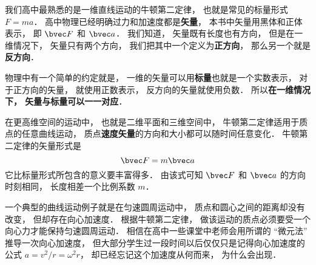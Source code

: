 
\begin{issues}
\issueDraft
\end{issues}


我们高中最熟悉的是一维直线运动的牛顿第二定律， 也就是常见的标量形式 $F = ma$． 高中物理已经明确过力和加速度都是\textbf{矢量}， 本书中矢量用黑体和正体表示， 即 $\bvec F$ 和 $\bvec a$． 我们知道， 矢量既有长度也有方向， 但是在一维情况下， 矢量只有两个方向， 我们把其中一个定义为\textbf{正方向}， 那么另一个就是\textbf{反方向}． 

物理中有一个简单的约定就是， 一维的矢量可以用\textbf{标量}也就是一个实数表示， 对于正方向的矢量， 就使用正数表示， 反方向的矢量就使用负数． 所以\textbf{在一维情况下， 矢量与标量可以一一对应}．

在更高维空间的运动中， 也就是二维平面和三维空间中， 牛顿第二定律适用于质点的任意曲线运动， 质点\textbf{速度矢量}的方向和大小都可以随时间任意变化． 牛顿第二定律的矢量形式是
\begin{equation}
\bvec F = m\bvec a
\end{equation}
它比标量形式所包含的意义要丰富得多． 由该式可知 $\bvec F$ 和 $\bvec a$ 的方向时刻相同， 长度相差一个比例系数 $m$．

一个典型的曲线运动例子就是在匀速圆周运动中， 质点和圆心之间的距离却没有改变， 但却存在向心加速度． 根据牛顿第二定律， 做该运动的质点必须要受一个向心力才能保持匀速圆周运动． 相信在高中一些课堂中老师会用所谓的 “微元法” 推导一次向心加速度， 但大部分学生过一段时间以后仅仅只是记得向心加速度的公式 $a = v^2/r = \omega^2 r$， 却已经忘记这个加速度从何而来， 为什么会出现．

